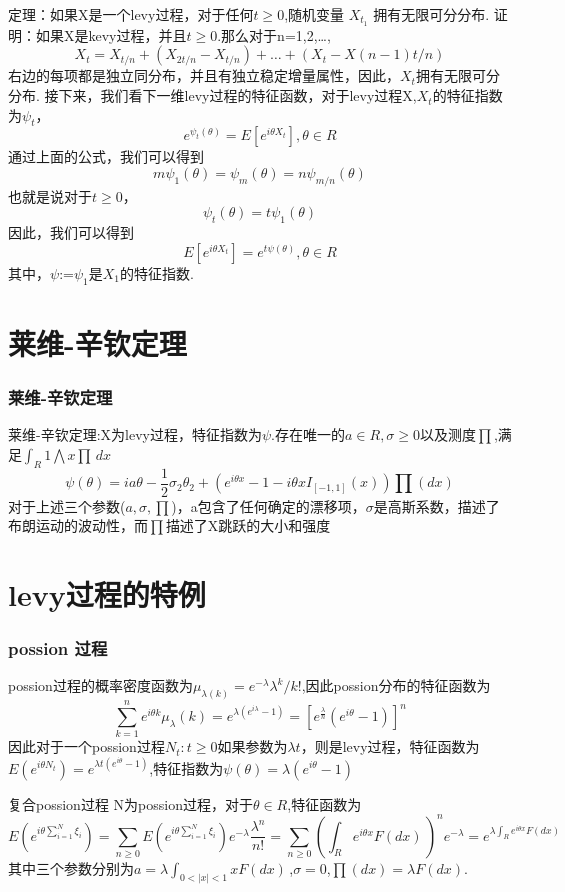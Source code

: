 \documentclass[10pt,aspectratio=169,mathserif]{beamer}
\begin{document}
\begin{frame}
	 定理：如果X是一个levy过程，对于任何$t \geq 0$,随机变量 $X_{t_1} $ 拥有无限可分分布.
	 证明：如果X是kevy过程，并且$t \geq 0$.那么对于n=1,2,\dots,\[ X_{t}=X_{t/n}+(X_{2t/n}-X_{t/n})+\dots+(X_{t}-X{(n-1)t/n})\]右边的每项都是独立同分布，并且有独立稳定增量属性，因此，${X_{t}}$拥有无限可分分布.
	 接下来，我们看下一维levy过程的特征函数，对于levy过程X,$X_{t}$的特征指数为$\psi_{t}$，\[e^{\psi_{t}(\theta)}=E[e^{i \theta X_{t}}] ,\theta \in R \]通过上面的公式，我们可以得到\[ m\psi_{1}(\theta)=\psi_{m}(\theta)=n\psi_{m/n}(\theta)\] 也就是说对于$t \geq 0$，\[\psi_{t}(\theta)=t\psi_{1}(\theta)\]因此，我们可以得到\[E[e^{i\theta X_{t}}]=e^{t\psi(\theta)}, \theta \in R\]其中，$\psi$:=$\psi_{1}$是$X_{1}$的特征指数.
	 
\end{frame}
\section{莱维-辛钦定理}
\begin{frame}
  \frametitle{莱维-辛钦定理}
   莱维-辛钦定理:X为levy过程，特征指数为$\psi$.存在唯一的$a \in R,\sigma \geq 0$以及测度$\prod$,满足$\int_R 1 \bigwedge x \prod \,dx$  \[\psi(\theta)=ia\theta-\frac{1}{2}\sigma_{2}\theta_{2}+(e^{i\theta x}-1-i\theta xI_{[-1,1]}(x))\prod(dx)\]对于上述三个参数($a,\sigma,\prod$)，a包含了任何确定的漂移项，$\sigma$是高斯系数，描述了布朗运动的波动性，而$\prod$描述了X跳跃的大小和强度
\end{frame}

\section{levy过程的特例}
\begin{frame}
\frametitle{possion 过程}
  possion过程的概率密度函数为$\mu_{\lambda({k})}=e^{-\lambda}\lambda^{k}/k!$,因此possion分布的特征函数为\[\sum_{k=1}^{n}e^{i\theta k}\mu_{\lambda}({k})=e^{\lambda(e^{i\lambda}-1)}=[e^{\frac{\lambda}{n}}(e^{i\theta}-1)]^{n} \]因此对于一个possion过程{$N_{t}:t \geq 0$}如果参数为$\lambda t$，则是levy过程，特征函数为$E(e^{i\theta N_{t}})=e^{\lambda t(e^{i\theta}-1)}$,特征指数为$\psi(\theta)=\lambda(e^{i\theta}-1)$
 \end{frame}

\begin{frame}
复合possion过程\newline\newline
  N为possion过程，对于$\theta \in R $,特征函数为\[E(e^{i\theta\sum_{i=1}^{N}\xi_{i}})=\sum_{n\geq0}E(e^{i\theta\sum_{i=1}^{N}\xi_{i}})e^{-\lambda}\frac{\lambda^{n}}{n!}
  =\sum_{n\geq0}(\int_R e^{i\theta x}F(dx)\,)^{n}e^{-\lambda}=e^{\lambda\int_R e^{i\theta x}F(dx)\,} \]其中三个参数分别为$a=\lambda\int_{0<|x|<1}xF(dx) \,$,$\sigma=0$,$\prod(dx)=\lambda F(dx)$.

\end{frame}
\end{document}

